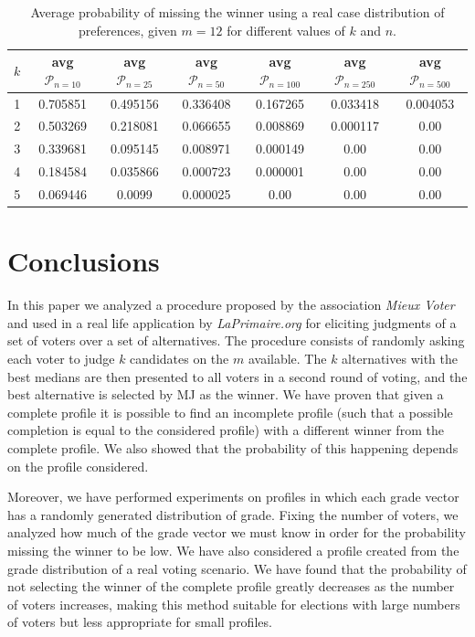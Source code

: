 	
	\begin{table}
		\centering
		\captionsetup{type=table}
		\caption{Average probability of missing the winner using a real case distribution of preferences, given $m=12$ for different values of $k$ and $n$.}
		\label{tab:MJelicitationUAV}
		\begin{tabular}{S[table-figures-integer=1, table-figures-decimal=0]S[table-figures-decimal=2]S[table-figures-decimal=2]S[table-figures-decimal=2]S[table-figures-decimal=2]S[table-figures-decimal=2]S[table-figures-decimal=2]}
			\toprule
			{$k$} & {avg $\mathcal{P}_{n=10}$} & {avg $\mathcal{P}_{n=25}$}& {avg $\mathcal{P}_{n=50}$}& {avg $\mathcal{P}_{n=100}$}& {avg $\mathcal{P}_{n=250}$} & {avg $\mathcal{P}_{n=500}$} \\
				&	0.705851	&	0.495156	&	0.336408	&	0.167265	&	0.033418	&	0.004053	\\
			2	&	0.503269	&	0.218081	&	0.066655	&	0.008869	&	0.000117	&	0.00	\\
			3	&	0.339681	&	0.095145	&	0.008971	&	0.000149	&	0.00	&	0.00	\\
			4	&	0.184584	&	0.035866	&	0.000723	&	0.000001	&	0.00	&	0.00	\\
			5	&	0.069446	&	0.0099	&	0.000025	&	0.00	&	0.00	&	0.00	\\				
			\bottomrule
		\end{tabular}
	\end{table}
	
	\section{Conclusions}
		In this paper we analyzed a procedure proposed by the association \textit{Mieux Voter} and used in a real life application by \textit{LaPrimaire.org} for eliciting judgments of a set of voters over a set of alternatives.
		The procedure consists of randomly asking each voter to judge $k$ candidates on the $m$ available. The $k$ alternatives with the best medians are then presented to all voters in a second round of voting, and the best alternative is selected by \ac{MJ} as the winner.
		We have proven that given a complete profile it is possible to find an incomplete profile (such that a possible completion is equal to the considered profile) with a different winner from the complete profile.
		We also showed that the probability of this happening depends on the profile considered. 
		
		Moreover, we have performed experiments on profiles in which each grade vector has a randomly generated distribution of grade. Fixing the number of voters, we analyzed how much of the grade vector we must know in order for the probability missing the winner to be low.
		We have also considered a profile created from the grade distribution of a real voting scenario. We have found that the probability of not selecting the winner of the complete profile greatly decreases as the number of voters increases, making this method suitable for elections with large numbers of voters but less appropriate for small profiles.
		
